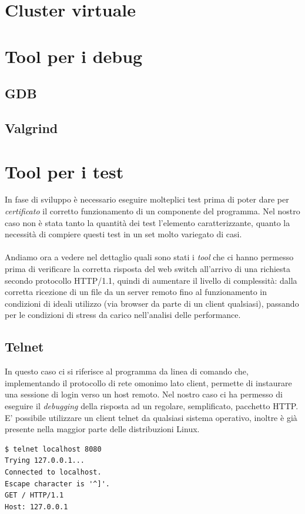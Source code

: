 \documentclass[italian]{tktltiki2}
\begin{document}
\newpage
\section{Cluster virtuale}

\newpage
\section{Tool per i debug}
\subsection{GDB}
\subsection{Valgrind}

\newpage
\section{Tool per i test}
In fase di sviluppo è necessario eseguire molteplici test prima di poter dare per \emph{certificato} il corretto funzionamento di un componente del programma. Nel nostro caso non è stata tanto la quantità dei test l'elemento caratterizzante, quanto la necessità di compiere questi test in un set molto variegato di casi. \\\\
Andiamo ora a vedere nel dettaglio quali sono stati i \emph{tool} che ci hanno permesso prima di verificare la corretta risposta del web switch all'arrivo di una richiesta secondo protocollo HTTP/1.1, quindi di aumentare il livello di complessità: dalla corretta ricezione di un file da un server remoto fino al funzionamento in condizioni di ideali utilizzo (via browser da parte di un client qualsiasi), passando per le condizioni di stress da carico nell'analisi delle performance.
\subsection{Telnet}
In questo caso ci si riferisce al programma da linea di comando che, implementando il protocollo di rete omonimo lato client, permette di instaurare una sessione di login verso un host remoto. Nel nostro caso ci ha permesso di eseguire il \emph{debugging} della risposta ad un regolare, semplificato, pacchetto HTTP. E' possibile utilizzare un client telnet da qualsiasi sistema operativo, inoltre è già presente nella maggior parte delle distribuzioni Linux.
\begin{lstlisting}
$ telnet localhost 8080
Trying 127.0.0.1...
Connected to localhost.
Escape character is '^]'.
GET / HTTP/1.1
Host: 127.0.0.1

\end{lstlisting}
\end{document}
